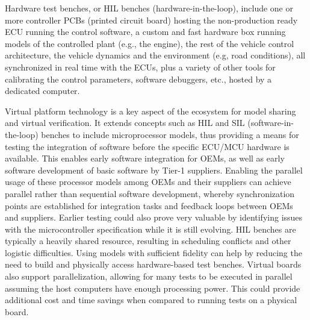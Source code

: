 \small
Hardware test benches, or HIL benches (hardware-in-the-loop), include one or more controller PCBs (printed circuit board) hosting the non-production ready ECU running the control software, a custom and fast hardware box running models of the controlled plant (e.g., the engine), the rest of the vehicle control architecture, the vehicle dynamics and the environment (e.g, road conditions), all synchronized in real time with the ECUs, plus a variety of other tools for calibrating the control parameters, software debuggers, etc., hosted by a dedicated computer.

Virtual platform technology is a key aspect of the ecosystem for model sharing and virtual verification.
It extends concepts such as HIL and SIL (software-in-the-loop) benches to include microprocessor models, thus providing a means for testing the integration of software before the specific ECU/MCU hardware is available.
This enables early software integration for OEMs, as well as early software development of basic software by Tier-1 suppliers.
Enabling the parallel usage of these processor models among OEMs and their suppliers can achieve parallel rather than sequential software development, whereby synchronization points are established for integration tasks and feedback loops between OEMs and suppliers.
Earlier testing could also prove very valuable by identifying issues with the microcontroller specification while it is still evolving.
% 
HIL benches are typically a heavily shared resource, resulting in scheduling conflicts and other logistic difficulties.
Using models with sufficient fidelity can help by reducing the need to build and physically access hardware-based test benches.
Virtual boards also support parallelization, allowing for many tests to be executed in parallel assuming the host computers have enough processing power.
This could provide additional cost and time savings when compared to running tests on a physical board.

